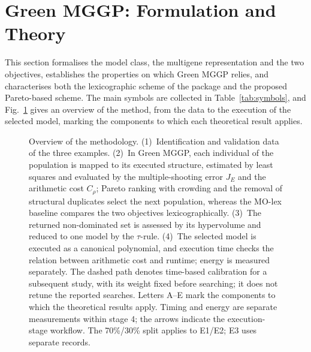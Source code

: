 \section{Green MGGP: Formulation and Theory}\label{sec:method}

This section formalises the model class, the multigene representation and the two objectives, establishes the
properties on which Green MGGP relies, and characterises both the lexicographic scheme of the package and the
proposed Pareto-based scheme. The main symbols are collected in Table~\ref{tab:symbols}, and
Fig.~\ref{fig:pipeline} gives an overview of the method, from the data to the execution of the selected model,
marking the components to which each theoretical result applies.

\begin{figure}[!htbp]
\centering
\resizebox{\textwidth}{!}{}
\caption{Overview of the methodology. (1)~Identification and validation data of the three examples. (2)~In Green
MGGP, each individual of the population is mapped to its executed structure, estimated by least squares and evaluated
by the multiple-shooting error $J_E$ and the arithmetic cost $C_\rho$; Pareto ranking with crowding and the removal of
structural duplicates select the next population, whereas the MO-lex baseline compares the two objectives
lexicographically. (3)~The returned non-dominated set is assessed by its hypervolume and reduced to one model by the
$\tau$-rule. (4)~The selected model is executed as a canonical polynomial, and execution time checks the relation between arithmetic cost and runtime; energy is measured separately. The dashed path denotes time-based calibration for a subsequent study, with its weight fixed before searching; it does not retune the reported searches. Letters A--E mark the components to which the theoretical results
apply. Timing and energy are separate measurements within stage 4; the arrows indicate the execution-stage workflow. The 70\%/30\% split applies to E1/E2; E3 uses separate records.}
\label{fig:pipeline}
\end{figure}

